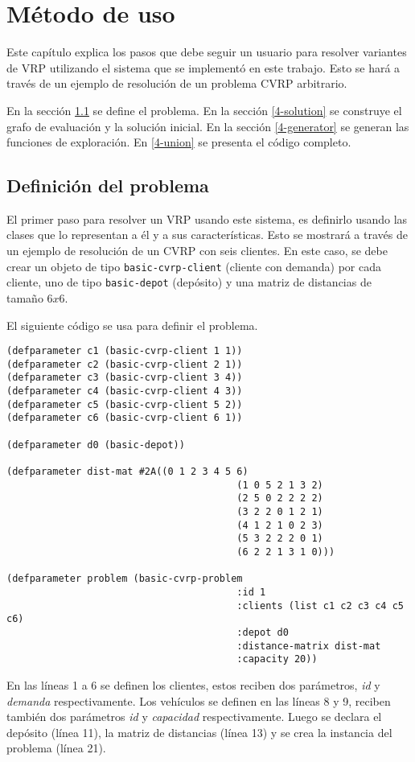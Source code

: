 \chapter{Método de uso}\label{chapter:Tutorial}

Este capítulo explica los pasos que debe seguir un usuario para resolver variantes de VRP utilizando el sistema que se implementó en este trabajo. Esto se hará a través de un ejemplo de resolución de un problema CVRP arbitrario.

En la sección \ref{4-problem} se define el problema. En la sección \ref{4-solution} se construye el grafo de evaluación y la solución inicial. En la sección \ref{4-generator} se generan las funciones de exploración. En \ref{4-union} se presenta el código completo.

\section{Definición del problema}\label{4-problem}

El primer paso para resolver un VRP usando este sistema, es definirlo usando las clases que lo representan a él y a sus características. Esto se mostrará a través de un ejemplo de resolución de un CVRP con seis clientes. En este caso, se debe crear un objeto de tipo \texttt{basic-cvrp-client} (cliente con demanda) por cada cliente, uno de tipo \texttt{basic-depot} (depósito) y una matriz de distancias de tamaño $6x6$. 

El siguiente código se usa para definir el problema.

 \begin{lstlisting}
(defparameter c1 (basic-cvrp-client 1 1))
(defparameter c2 (basic-cvrp-client 2 1))
(defparameter c3 (basic-cvrp-client 3 4))
(defparameter c4 (basic-cvrp-client 4 3))
(defparameter c5 (basic-cvrp-client 5 2))
(defparameter c6 (basic-cvrp-client 6 1))

(defparameter d0 (basic-depot))

(defparameter dist-mat #2A((0 1 2 3 4 5 6)
										(1 0 5 2 1 3 2)
										(2 5 0 2 2 2 2)
										(3 2 2 0 1 2 1)
										(4 1 2 1 0 2 3)
										(5 3 2 2 2 0 1)
										(6 2 2 1 3 1 0)))

(defparameter problem (basic-cvrp-problem 
										:id 1 
										:clients (list c1 c2 c3 c4 c5 c6)
										:depot d0 
										:distance-matrix dist-mat 
										:capacity 20))
\end{lstlisting}

En las líneas 1 a 6 se definen los clientes, estos reciben dos parámetros, \textit{id} y \textit{demanda} respectivamente. Los vehículos se definen en las líneas 8 y 9, reciben también dos parámetros \textit{id} y \textit{capacidad} respectivamente. Luego se declara el depósito (línea 11), la matriz de distancias (línea 13) y se crea la instancia del problema (línea 21).

